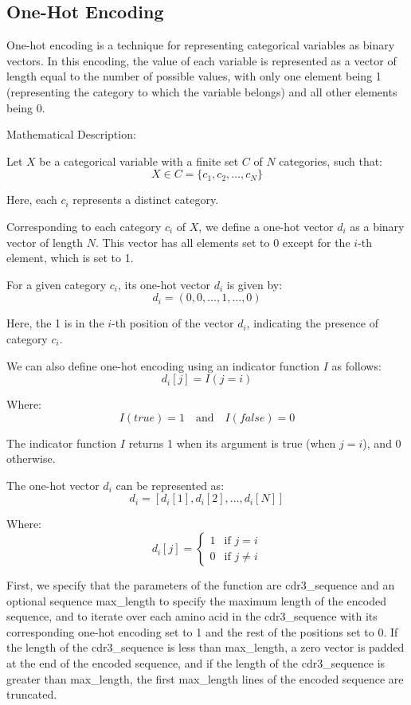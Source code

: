 \documentclass[conference]{IEEEtran}
\begin{document}
	\subsection{One-Hot Encoding}\label{AA}
	One-hot encoding is a technique for representing categorical variables as binary vectors. In this encoding, the value of each variable is represented as a vector of length equal to the number of possible values, with only one element being 1 (representing the category to which the variable belongs) and all other elements being 0.
	
	Mathematical Description:
	
	Let \( X \) be a categorical variable with a finite set \( C \) of \( N \) categories, such that:
	\[ X \in C = \{ c_1, c_2, \ldots, c_N \} \]
	
	Here, each \( c_i \) represents a distinct category.
	
	Corresponding to each category \( c_i \) of \( X \), we define a one-hot vector \( d_i \) as a binary vector of length \( N \). This vector has all elements set to 0 except for the \( i \)-th element, which is set to 1.

	For a given category \( c_i \), its one-hot vector \( d_i \) is given by:
	\[ d_i = (0, 0, \ldots, 1, \ldots, 0) \]
	
	Here, the 1 is in the \( i \)-th position of the vector \( d_i \), indicating the presence of category \( c_i \).
	
	We can also define one-hot encoding using an indicator function \( I \) as follows:
	\[ d_{i}[j] = I(j = i) \]
	
	Where:
	\[ I(true) = 1 \quad \text{and} \quad I(false) = 0 \]
	
	The indicator function \( I \) returns 1 when its argument is true (when \( j = i \)), and 0 otherwise.
	
	The one-hot vector \( d_i \) can be represented as:
	\[ d_i = [d_{i}[1], d_{i}[2], \ldots, d_{i}[N]] \]
	
	Where:
	\[ d_{i}[j] = 
	\begin{cases} 
		1 & \text{if } j = i \\ 
		0 & \text{if } j \neq i 
	\end{cases}
	\]
	
	First, we specify that the parameters of the function are cdr3\_sequence and an optional sequence max\_length to specify the maximum length of the encoded sequence, and to iterate over each amino acid in the cdr3\_sequence with its corresponding one-hot encoding set to 1 and the rest of the positions set to 0. If the length of the cdr3\_sequence is less than max\_length, a zero vector is padded at the end of the encoded sequence, and if the length of the cdr3\_sequence is greater than max\_length, the first max\_length lines of the encoded sequence are truncated.
\end{document}
